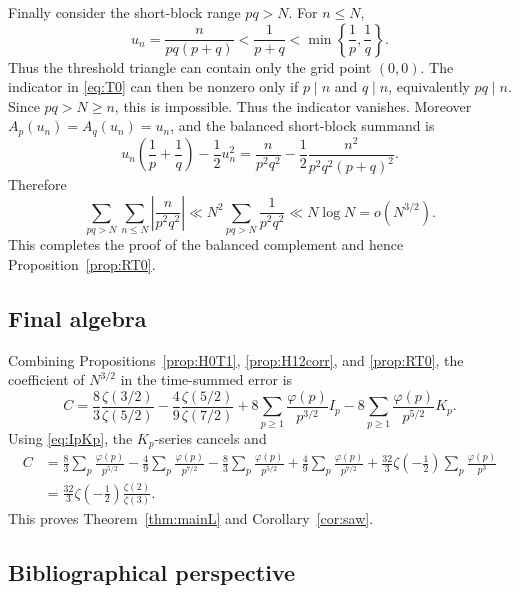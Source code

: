 \documentclass[a4paper,american,11pt]{amsart}
\theoremstyle{plain}
\theoremstyle{definition}
\begin{document}
Finally consider the short-block range \(pq>N\).  For \(n\le N\),
\[
 u_n=\frac{n}{pq(p+q)}<\frac1{p+q}<\min\left\{\frac1p,\frac1q\right\}.
\]
Thus the threshold triangle can contain only the grid point \((0,0)\).  The
indicator in \eqref{eq:T0} can then be nonzero only if \(p\mid n\) and
\(q\mid n\), equivalently \(pq\mid n\).  Since \(pq>N\ge n\), this is
impossible.  Thus the indicator vanishes.  Moreover \(A_p(u_n)=A_q(u_n)=u_n\),
and the balanced short-block summand is
\[
 u_n\left(\frac1p+\frac1q\right)-\frac12u_n^2
 =\frac{n}{p^2q^2}-\frac12\frac{n^2}{p^2q^2(p+q)^2}.
\]
Therefore
\[
 \sum_{pq>N}\sum_{n\le N}\left|\frac{n}{p^2q^2}\right|
 \ll
 N^2\sum_{pq>N}\frac1{p^2q^2}
 \ll N\log N=o(N^{3/2}).
\]
This completes the proof of the balanced complement and hence
Proposition~\ref{prop:RT0}.

\subsection{Final algebra}

Combining Propositions~\ref{prop:H0T1}, \ref{prop:H12corr}, and
\ref{prop:RT0}, the coefficient of \(N^{3/2}\) in the time-summed error is
\[
 C=\frac83\frac{\zeta(3/2)}{\zeta(5/2)}
 -\frac49\frac{\zeta(5/2)}{\zeta(7/2)}
 +8\sum_{p\ge1}\frac{\varphi(p)}{p^{3/2}}I_p
 -8\sum_{p\ge1}\frac{\varphi(p)}{p^{5/2}}K_p.
\]
Using \eqref{eq:IpKp}, the \(K_p\)-series cancels and
\begin{align*}
 C&=\frac83\sum_p\frac{\varphi(p)}{p^{5/2}}
 -\frac49\sum_p\frac{\varphi(p)}{p^{7/2}}
 -\frac83\sum_p\frac{\varphi(p)}{p^{5/2}}
 +\frac49\sum_p\frac{\varphi(p)}{p^{7/2}}
 +\frac{32}{3}\zeta\!\left(-\frac12\right)\sum_p\frac{\varphi(p)}{p^3}\\
 &=\frac{32}{3}\zeta\!\left(-\frac12\right)\frac{\zeta(2)}{\zeta(3)}.
\end{align*}
This proves Theorem~\ref{thm:mainL} and Corollary~\ref{cor:saw}.


\subsection{Bibliographical perspective}
\end{document}
